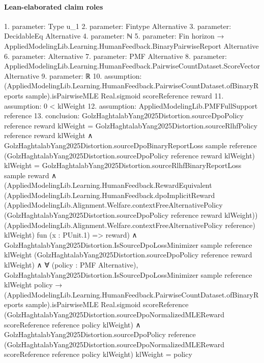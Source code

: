 \documentclass[10pt]{article}
\begin{document}
\paragraph{Lean-elaborated claim roles}\begin{ReviewVerbatim}
1. parameter: Type u_1
2. parameter: Fintype Alternative
3. parameter: DecidableEq Alternative
4. parameter: ℕ
5. parameter: Fin horizon → AppliedModelingLib.Learning.HumanFeedback.BinaryPairwiseReport Alternative
6. parameter: Alternative
7. parameter: PMF Alternative
8. parameter: AppliedModelingLib.Learning.HumanFeedback.PairwiseCountDataset.ScoreVector Alternative
9. parameter: ℝ
10. assumption: (AppliedModelingLib.Learning.HumanFeedback.PairwiseCountDataset.ofBinaryReports sample).isPairwiseMLE Real.sigmoid
  scoreReference reward
11. assumption: 0 < klWeight
12. assumption: AppliedModelingLib.PMFFullSupport reference
13. conclusion: GolzHaghtalabYang2025Distortion.sourceDpoPolicy reference reward klWeight =
    GolzHaghtalabYang2025Distortion.sourceRlhfPolicy reference reward klWeight ∧
  GolzHaghtalabYang2025Distortion.sourceDpoBinaryReportLoss sample reference
        (GolzHaghtalabYang2025Distortion.sourceDpoPolicy reference reward klWeight) klWeight =
      GolzHaghtalabYang2025Distortion.sourceRlhfBinaryReportLoss sample reward ∧
    (AppliedModelingLib.Learning.HumanFeedback.RewardEquivalent
        (AppliedModelingLib.Learning.HumanFeedback.dpoImplicitReward
          (AppliedModelingLib.Alignment.Welfare.contextFreeAlternativePolicy
            (GolzHaghtalabYang2025Distortion.sourceDpoPolicy reference reward klWeight))
          (AppliedModelingLib.Alignment.Welfare.contextFreeAlternativePolicy reference) klWeight)
        fun (x : PUnit.{1}) => reward) ∧
      GolzHaghtalabYang2025Distortion.IsSourceDpoLossMinimizer sample reference klWeight
          (GolzHaghtalabYang2025Distortion.sourceDpoPolicy reference reward klWeight) ∧
        ∀ (policy : PMF Alternative),
          GolzHaghtalabYang2025Distortion.IsSourceDpoLossMinimizer sample reference klWeight policy →
            (AppliedModelingLib.Learning.HumanFeedback.PairwiseCountDataset.ofBinaryReports sample).isPairwiseMLE
                Real.sigmoid scoreReference
                (GolzHaghtalabYang2025Distortion.sourceDpoNormalizedMLEReward scoreReference reference policy
                  klWeight) ∧
              GolzHaghtalabYang2025Distortion.sourceDpoPolicy reference
                  (GolzHaghtalabYang2025Distortion.sourceDpoNormalizedMLEReward scoreReference reference policy
                    klWeight)
                  klWeight =
                policy
\end{ReviewVerbatim}
\end{document}

